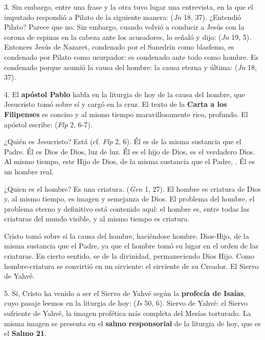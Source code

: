 \begin{body}
3. Sin embargo, entre una frase y la otra tuvo lugar una entrevista, en la que el imputado respondió a Pilato de la siguiente manera:  (\textit{Jn} 18, 37). ¿Entendió Pilato? Parece que no. Sin embargo, cuando volvió a conducir a Jesús con la corona de espinas en la cabeza ante los acusadores, lo señaló y dijo:  (\textit{Jn} 19, 5). Entonces Jesús de Nazaret, condenado por el Sanedrín como blasfemo, es condenado por Pilato como usurpador: es condenado ante todo como hombre. Es condenado porque asumió la causa del hombre: la causa eterna y última:  (\textit{Jn} 18, 37).

4. El \textbf{apóstol Pablo} habla en la liturgia de hoy de la causa del hombre, que Jesucristo tomó sobre sí y cargó en la cruz. El texto de la \textbf{Carta a los Filipenses} es conciso y al mismo tiempo maravillosamente rico, profundo. El apóstol escribe:  (\textit{Flp} 2, 6-7).

¿Quién es Jesucristo? Está  (cf. \textit{Flp} 2, 6). Él es de la misma sustancia que el Padre. Él es Dios de Dios, luz de luz. Él es el hijo de Dios, es el verdadero Dios. Al mismo tiempo, este Hijo de Dios, de la misma sustancia que el Padre, . Él es un hombre real.

¿Quien es el hombre? Es una criatura.  (\textit{Gen} 1, 27). El hombre es criatura de Dios y, al mismo tiempo, es imagen y semejanza de Dios. El problema del hombre, el problema eterno y definitivo está contenido aquí: el hombre es, entre todas las criaturas del mundo visible,  y al mismo tiempo es criatura.

Cristo tomó sobre sí la causa del hombre, haciéndose hombre. Dios-Hijo, de la misma sustancia que el Padre, ya que el hombre tomó su lugar en el orden de las criaturas. En cierto sentido, se  de la divinidad, permaneciendo Dios Hijo. Como hombre-criatura se convirtió en un sirviente: el sirviente de su Creador. El Siervo de Yahvé.

5. Sí, Cristo ha venido a ser el Siervo de Yahvé según la \textbf{profecía de Isaías}, cuyo pasaje leemos en la liturgia de hoy:  (\textit{Is} 50, 6). Siervo de Yahvé: el Siervo sufriente de Yahvé, la imagen profética más completa del Mesías torturado. La misma imagen se presenta en el \textbf{salmo responsorial} de la liturgia de hoy, que es el \textbf{Salmo 21}.


\end{body}
